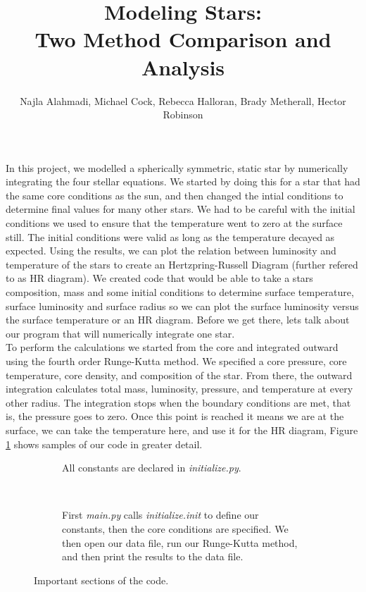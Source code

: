 \documentclass[10pt]{article}
\title{Modeling Stars: \\ Two Method Comparison and Analysis}
\author{Najla Alahmadi, Michael Cock, Rebecca Halloran, Brady Metherall, Hector Robinson}
\begin{document}
\maketitle

\lstset{style=mystyle}

In this project, we modelled a spherically symmetric, static star by numerically integrating the four stellar equations. We started by doing this for a star that had the same core conditions as the sun, and then changed the intial conditions to determine final values for many other stars. We had to be careful with the initial conditions we used to ensure that the temperature went to zero at the surface still. The initial conditions were valid as long as the temperature decayed as expected. Using the results, we can plot the relation between luminosity and temperature of the stars to create an Hertzpring-Russell Diagram (further refered to as HR diagram). We created code that would be able to take a stars composition, mass and some initial conditions to determine surface temperature, surface luminosity and surface radius so we can plot the surface luminosity versus the surface temperature or an HR diagram. Before we get there, lets talk about our program that will numerically integrate one star. \\

To perform the calculations we started from the core and integrated outward using the fourth order Runge-Kutta method. We specified a core pressure, core temperature, core density, and composition of the star. From there, the outward integration calculates total mass, luminosity, pressure, and temperature at every other radius. The integration stops when the boundary conditions are met, that is, the pressure goes to zero. Once this point is reached it means we are at the surface, we can take the temperature here, and use it for the HR diagram, Figure \ref{fig:code} shows samples of our code in greater detail. \\

\begin{figure}[htbp]
 \begin{subfigure}{\textwidth}
  
  \caption{All constants are declared in \emph{initialize.py}.}
 \end{subfigure} \\
 \begin{subfigure}{\textwidth}
  
  
  
  
  \caption{First \emph{main.py} calls \emph{initialize.init} to define our constants, then the core conditions are specified. We then open our data file, run our Runge-Kutta method, and then print the results to the data file.}
 \end{subfigure}
 \caption{Important sections of the code.}
 \label{fig:code}
\end{figure}
\end{document}
